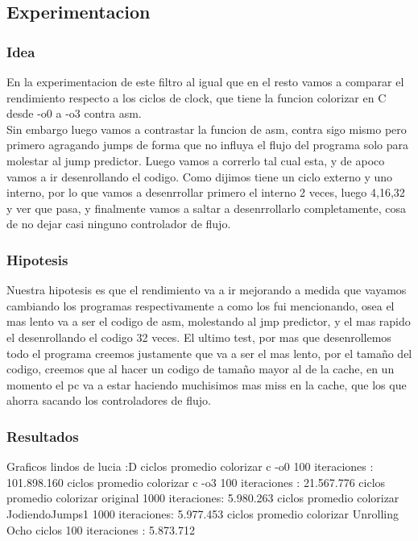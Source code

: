 	
\subsection{Experimentacion}
\subsubsection{Idea}	En la experimentacion de este filtro al igual que en el resto vamos a comparar el rendimiento respecto a los ciclos de clock, que tiene la funcion colorizar en C desde -o0 a -o3 contra asm. \\ Sin embargo luego vamos a contrastar la funcion de asm, contra sigo mismo pero primero agragando jumps de forma que no influya el flujo del programa solo para molestar al jump predictor. Luego vamos a correrlo tal cual esta, y de apoco vamos a ir desenrollando el codigo. Como dijimos tiene un ciclo externo y uno interno, por lo que vamos a desenrrollar primero el interno 2 veces, luego 4,16,32 y ver que pasa, y finalmente vamos a saltar a desenrrollarlo completamente, cosa de no dejar casi ninguno controlador de flujo.
	   
\subsubsection{Hipotesis}
	Nuestra hipotesis es que el rendimiento va a ir mejorando a medida que vayamos cambiando los programas respectivamente a como los fui mencionando, osea el mas lento va a ser el codigo de asm, molestando al jmp predictor, y el mas rapido el desenrollando el codigo 32 veces. El ultimo test, por mas que desenrollemos todo el programa creemos justamente que va a ser el mas lento, por el tamaño del codigo, creemos que al hacer un codigo de tamaño mayor al de la cache, en un momento el pc va a estar haciendo muchisimos mas miss en la cache, que los que ahorra sacando los controladores de flujo.
	
	
\subsubsection{Resultados}
	Graficos lindos de lucia :D
	ciclos promedio colorizar c -o0 100 iteraciones : 101.898.160
	ciclos promedio colorizar c -o3 100 iteraciones : 21.567.776
	ciclos promedio colorizar original 1000 iteraciones: 5.980.263
	ciclos promedio colorizar JodiendoJumps1 1000 iteraciones: 5.977.453
	ciclos promedio colorizar Unrolling Ocho ciclos 100 iteraciones : 5.873.712
	
	
	
